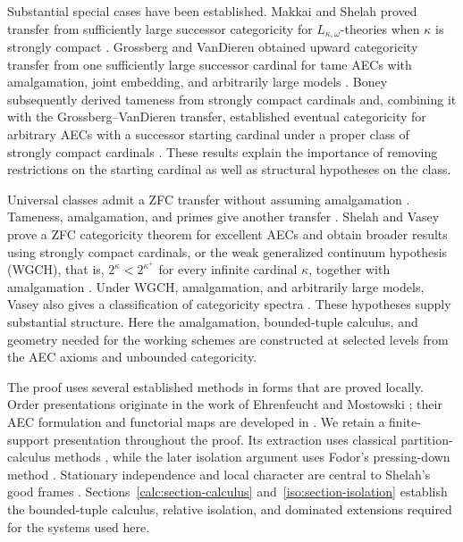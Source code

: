 Substantial special cases have been established. Makkai and Shelah
proved transfer from sufficiently large successor categoricity for
$L_{\kappa,\omega}$-theories when $\kappa$ is strongly compact
\cite[Conclusion~5.1]{MakkaiShelah1990}. Grossberg and VanDieren
obtained upward categoricity transfer from one sufficiently large successor
cardinal for tame AECs with amalgamation, joint embedding, and arbitrarily
large models \cite[Theorem~5.2]{GrossbergVanDieren2006}.
Boney subsequently derived tameness from strongly compact cardinals and,
combining it with the Grossberg--VanDieren transfer, established eventual
categoricity for arbitrary AECs with a successor starting cardinal under
a proper class of strongly compact cardinals \cite{Boney2014}.
These results explain the importance of removing restrictions on the
starting cardinal as well as structural hypotheses on the class.

Universal classes admit
a ZFC transfer without assuming amalgamation
\cite[Theorem~7.3]{VaseyUniversalII}.  Tameness, amalgamation, and primes
give another transfer \cite[Theorem~3.8]{VaseyTamePrimes}.
Shelah and Vasey prove a ZFC categoricity theorem for excellent AECs and
obtain broader results using strongly compact cardinals, or the weak
generalized continuum hypothesis (WGCH), that is,
$2^\kappa<2^{\kappa^+}$ for every infinite cardinal $\kappa$, together
with amalgamation
\cite[Theorem~14.2 and Corollaries~14.7, 14.10]{ShelahVasey2024}.
Under WGCH, amalgamation, and arbitrarily large models, Vasey also gives
a classification of categoricity spectra
\cite[Corollary~9.7]{VaseySpectrum}.  These hypotheses supply substantial
structure. Here the amalgamation, bounded-tuple calculus, and geometry
needed for the working schemes are constructed at selected levels from
the AEC axioms and unbounded categoricity.

The proof uses several established methods in forms that are proved
locally.  Order presentations originate in the work of Ehrenfeucht and
Mostowski \cite{EhrenfeuchtMostowski1956}; their AEC formulation and
functorial maps are developed in
\cite[IV.0.8--IV.0.9 and IV.0.12]{Shelah2009}.  We retain a finite-support
presentation throughout the proof.  Its extraction uses classical
partition-calculus methods \cite{ErdosRado1956}, while the later
isolation argument uses Fodor's pressing-down method \cite{Fodor1956}.
Stationary independence and local character are central to Shelah's good
frames \cite[II.2.1]{Shelah2009}.  Sections~\ref{calc:section-calculus}
and~\ref{iso:section-isolation} establish the bounded-tuple calculus,
relative isolation, and dominated extensions required for the systems
used here.

